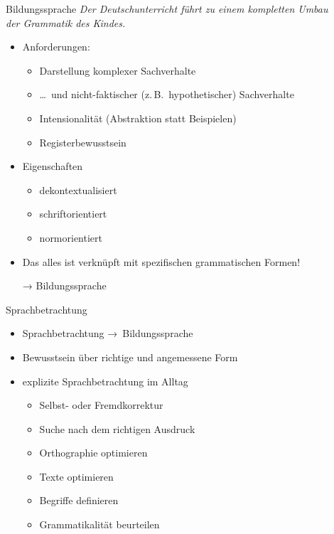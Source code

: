 \begin{frame}
  {Bildungssprache}
  \onslide<+->
  \onslide<+->
  \alert{\textit{Der Deutschunterricht führt zu einem kompletten Umbau\\
  der Grammatik des Kindes.}} \\
  \Zeile
  \begin{itemize}[<+->]
    \item Anforderungen:
    \begin{itemize}[<+->]
      \item Darstellung komplexer Sachverhalte
      \item \dots\ und nicht-faktischer (z.\,B.\ hypothetischer) Sachverhalte
      \item Intensionalität (Abstraktion statt Beispielen)
      \item Registerbewusstsein
    \end{itemize}
       \Halbzeile 
      \item Eigenschaften
    \begin{itemize}[<+->]
      \item dekontextualisiert
      \item schriftorientiert
      \item normorientiert
    \end{itemize}
        \Halbzeile
      \item \alert{Das alles ist verknüpft mit spezifischen grammatischen Formen!}
      \item[→] \alert{Bildungssprache}
  \end{itemize}
\end{frame}

\begin{frame}
  {Sprachbetrachtung}
  \onslide<+->
  \begin{itemize}[<+->]
    \item \alert{Sprachbetrachtung →\ Bildungssprache}
     \Zeile 
    \item Bewusstsein über richtige und angemessene Form
     \Zeile 
    \item explizite Sprachbetrachtung im Alltag
      \Halbzeile
      \begin{itemize}[<+->]
        \item Selbst- oder Fremdkorrektur
        \item Suche nach dem richtigen Ausdruck
        \item Orthographie optimieren
        \item Texte optimieren
        \item Begriffe definieren
        \item Grammatikalität beurteilen
      \end{itemize}
  \end{itemize}
\end{frame}

